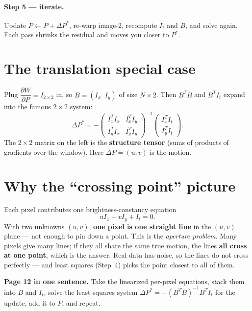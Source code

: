 \documentclass[11pt]{article}
\newcommand{\dP}{\Delta P}
\begin{document}
\paragraph{Step 5 --- iterate.}
Update $P \leftarrow P + \dP^*$, re-warp image-2, recompute $I_t$ and $B$, and
solve again. Each pass shrinks the residual and moves you closer to $P^*$.

\section*{The translation special case}

Plug $\dfrac{\partial W}{\partial P} = I_{2\times 2}$ in, so $B = (I_x\;\; I_y)$
of size $N\times 2$. Then $B^T B$ and $B^T I_t$ expand into the famous
$2\times 2$ system:
\[
  \dP^* = -\begin{pmatrix} I_x^T I_x & I_x^T I_y \\[2pt]
                           I_y^T I_x & I_y^T I_y \end{pmatrix}^{-1}
            \begin{pmatrix} I_x^T I_t \\[2pt] I_y^T I_t \end{pmatrix}.
\]
The $2\times 2$ matrix on the left is the \textbf{structure tensor} (sums of
products of gradients over the window). Here $\dP = (u,v)$ is the motion.

\section*{Why the ``crossing point'' picture}

Each pixel contributes one brightness-constancy equation
\[
  u I_x + v I_y + I_t = 0 .
\]
With two unknowns $(u,v)$, \textbf{one pixel is one straight line} in the $(u,v)$
plane --- not enough to pin down a point. This is the \emph{aperture problem}.
Many pixels give many lines; if they all share the same true motion, the lines
\textbf{all cross at one point}, which is the answer. Real data has noise, so the
lines do not cross perfectly --- and least squares (Step~4) picks the point
closest to all of them.

\bigskip
\begin{keybox}
\textbf{Page 12 in one sentence.} Take the linearized per-pixel equations, stack
them into $B$ and $I_t$, solve the least-squares system
$\dP^* = -(B^T B)^{-1} B^T I_t$ for the update, add it to $P$, and repeat.
\end{keybox}
\end{document}
